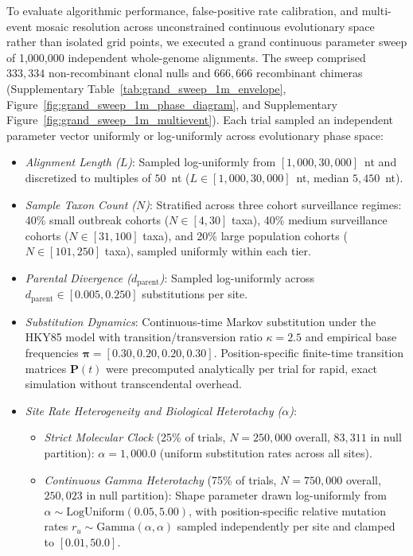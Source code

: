 To evaluate algorithmic performance, false-positive rate calibration, and multi-event mosaic resolution across unconstrained continuous evolutionary space rather than isolated grid points, we executed a grand continuous parameter sweep of 1,000,000 independent whole-genome alignments.
The sweep comprised $333{,}334$ non-recombinant clonal nulls and $666{,}666$ recombinant chimeras (Supplementary Table~\ref{tab:grand_sweep_1m_envelope}, Figure~\ref{fig:grand_sweep_1m_phase_diagram}, and Supplementary Figure~\ref{fig:grand_sweep_1m_multievent}).
Each trial sampled an independent parameter vector uniformly or log-uniformly across evolutionary phase space:
\begin{itemize}
    \item \emph{Alignment Length ($L$)}: Sampled log-uniformly from $[1{,}000, 30{,}000]$~nt and discretized to multiples of $50$~nt ($L \in [1{,}000, 30{,}000]$~nt, median $5{,}450$~nt).
    \item \emph{Sample Taxon Count ($N$)}: Stratified across three cohort surveillance regimes: 40\% small outbreak cohorts ($N \in [4, 30]$ taxa), 40\% medium surveillance cohorts ($N \in [31, 100]$ taxa), and 20\% large population cohorts ($N \in [101, 250]$ taxa), sampled uniformly within each tier.
    \item \emph{Parental Divergence ($d_{\mathrm{parent}}$)}: Sampled log-uniformly across $d_{\mathrm{parent}} \in [0.005, 0.250]$ substitutions per site.
    \item \emph{Substitution Dynamics}: Continuous-time Markov substitution under the HKY85 model with transition/transversion ratio $\kappa = 2.5$ and empirical base frequencies $\bm{\pi} = [0.30, 0.20, 0.20, 0.30]$. Position-specific finite-time transition matrices $\mathbf{P}(t)$ were precomputed analytically per trial for rapid, exact simulation without transcendental overhead.
    \item \emph{Site Rate Heterogeneity and Biological Heterotachy ($\alpha$)}:
    \begin{itemize}
        \item \textit{Strict Molecular Clock} (25\% of trials, $N = 250{,}000$ overall, $83{,}311$ in null partition): $\alpha = 1{,}000.0$ (uniform substitution rates across all sites).
        \item \textit{Continuous Gamma Heterotachy} (75\% of trials, $N = 750{,}000$ overall, $250{,}023$ in null partition): Shape parameter drawn log-uniformly from $\alpha \sim \text{LogUniform}(0.05, 5.00)$, with position-specific relative mutation rates $r_u \sim \text{Gamma}(\alpha, \alpha)$ sampled independently per site and clamped to $[0.01, 50.0]$.

\end{itemize}
\end{itemize}
